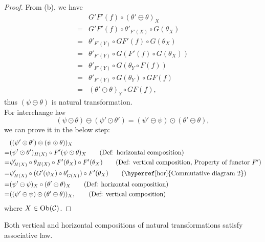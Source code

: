 \documentclass{article}
\begin{document}
\begin{proof}
	From (b), we have
	\begin{align*}
		& G'F'(f)\circ(\theta'\ominus\theta)_X\\
		=& G'F'(f)\circ\theta'_{F'(X)}\circ G(\theta_X)\tag{Def: horizontal composition}\\
		=& \theta'_{F'(Y)}\circ GF'(f)\circ G(\theta_X)\tag{Property of natural transformation $\theta'$}\\
		=& \theta'_{F'(Y)}\circ G(F'(f)\circ G(\theta_X))\tag{Property of functor $G$}\\
		=& \theta'_{F'(Y)}\circ G(\theta_Y\circ F(f))\tag{Property of natural transformation $\theta$}\\
		=& \theta'_{F'(Y)}\circ G(\theta_Y)\circ GF(f)\tag{Property of functor $G$}\\
		=& (\theta'\ominus\theta)_Y\circ GF(f)\tag{Def: horizontal composition},
	\end{align*}
	thus $(\psi\ominus\theta)$ is natural transformation.\\
		
	For interchange law
		\begin{equation}\label{per}
			(\psi\odot\theta)\ominus(\psi'\odot\theta')=(\psi'\ominus\psi)\odot(\theta'\ominus\theta),
		\end{equation}
	we can prove it in the below step:
	\begin{align*}
		 & ((\psi'\odot\theta')\ominus(\psi\odot\theta))_X\\
		=& (\psi'\odot\theta')_{H(X)}\circ F'(\psi\odot\theta)_X\tag{Def: horizontal composition}\\
		=& \psi'_{H(X)}\circ\theta_{H(X)}\circ F'(\theta_X)\circ F'(\theta_X)\tag{Def: vertical composition, Property of functor $F'$}\\
		=& \psi'_{H(X)}\circ(G'(\psi_X)\circ \theta'_{G(X)})\circ F'(\theta_X)\tag{\hyperref[hor]{Commutative diagram 2}}\\
		=& (\psi'\ominus\psi)_X\circ(\theta'\ominus\theta)_X\tag{Def: horizontal composition}\\
		=& ((\psi'\ominus\psi)\odot(\theta'\ominus\theta))_X,\tag{Def: vertical composition}
	\end{align*}
	where $X\in\mathrm{Ob}(\mathcal{C})$.
\end{proof}

\begin{thm}
	Both vertical and horizontal compositions of natural transformations satisfy associative law.
\end{thm}
\end{document}
